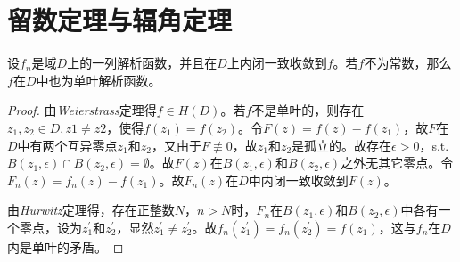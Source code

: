 \chapter{留数定理与辐角定理}



\begin{theorem}
	设${f_n}$是域$D$上的一列解析函数，并且在$D$上内闭一致收敛到$f$。若$f$不为常数，那么$f$在$D$中也为单叶解析函数。
\end{theorem}
\begin{proof}
	由\emph{Weierstrass}定理得$f\in H(D)$。若$f$不是单叶的，则存在$z_1,z_2\in D, z1\neq z2$，使得$f(z_1)=f(z_2)$。令$F(z)=f(z)-f(z_1)$，故$F$在$D$中有两个互异零点$z_1$和$z_2$，又由于$F\not \equiv 0$，故$z_1$和$z_2$是孤立的。故存在$\epsilon >0$，s.t.$B(z_1,\epsilon)\cap B(z_2,\epsilon)=\emptyset$。故$F(z)$在$B(z_1,\epsilon)$和$B(z_2,\epsilon)$之外无其它零点。令$F_n(z)=f_n(z)-f(z_1)$。故${F_n(z)}$在$D$中内闭一致收敛到$F(z)$。\par
	由\emph{Hurwitz}定理得，存在正整数$N$，$n>N$时，$F_n$在$B(z_1,\epsilon)$和$B(z_2,\epsilon)$中各有一个零点，设为$z_1^\prime$和$z_2^\prime$，显然$z_1^\prime \neq z_2^\prime $。故$f_n(z_1^\prime)=f_n(z_2^\prime)=f(z_1)$，这与$f_n$在$D$内是单叶的矛盾。
\end{proof}


